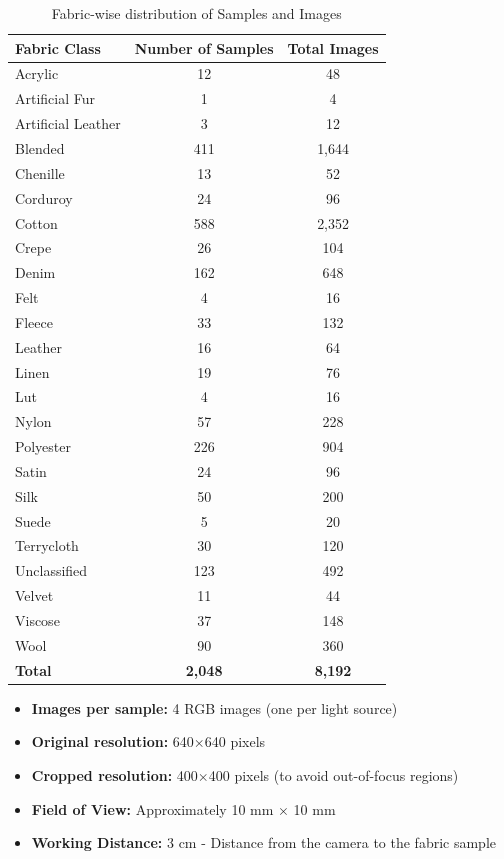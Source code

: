 \begin{table}[H]
\centering
\caption{Fabric-wise distribution of Samples and Images}
\label{tab:fabric_distribution}
\begin{tabular}{|l|c|c|}
\hline
\textbf{Fabric Class} & \textbf{Number of Samples} & \textbf{Total Images} \\
\hline
Acrylic & 12 & 48 \\
Artificial Fur & 1 & 4 \\
Artificial Leather & 3 & 12 \\
Blended & 411 & 1,644 \\
Chenille & 13 & 52 \\
Corduroy & 24 & 96 \\
Cotton & 588 & 2,352 \\
Crepe & 26 & 104 \\
Denim & 162 & 648 \\
Felt & 4 & 16 \\
Fleece & 33 & 132 \\
Leather & 16 & 64 \\
Linen & 19 & 76 \\
Lut & 4 & 16 \\
Nylon & 57 & 228 \\
Polyester & 226 & 904 \\
Satin & 24 & 96 \\
Silk & 50 & 200 \\
Suede & 5 & 20 \\
Terrycloth & 30 & 120 \\
Unclassified & 123 & 492 \\
Velvet & 11 & 44 \\
Viscose & 37 & 148 \\
Wool & 90 & 360 \\
\hline
\textbf{Total} & \textbf{2,048} & \textbf{8,192} \\
\hline
\end{tabular}
\end{table}


\begin{itemize}[noitemsep, topsep=0pt]
    \item \textbf{Images per sample:} 4 RGB images (one per light source)
    \item \textbf{Original resolution:} 640$\times$640 pixels
    \item \textbf{Cropped resolution:} 400$\times$400 pixels (to avoid out-of-focus regions)
    \item \textbf{Field of View:} Approximately 10 mm $\times$ 10 mm
    \item \textbf{Working Distance:} 3 cm - Distance from the camera to the fabric sample
\end{itemize}

